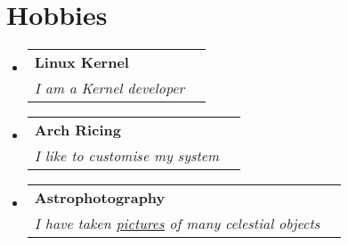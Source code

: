 \documentclass[letterpaper,11pt]{article}
\makeatletter
\newcommand{\resumeSubheading}[4]{
  \vspace{-2pt}\item
    \begin{tabular*}{1.0\textwidth}[t]{l@{\extracolsep{\fill}}r}
      \textbf{#1} & \textbf{\small #2} \\
      \textit{\small#3} & \textit{\small #4} \\
    \end{tabular*}\vspace{-7pt}
}
\newcommand{\resumeSubHeadingListStart}{\begin{itemize}[leftmargin=0.0in, label={}]}
\newcommand{\resumeSubHeadingListEnd}{\end{itemize}}
\makeatother
\begin{document}
\section{Hobbies}
    \resumeSubHeadingListStart
    \resumeSubheading{Linux Kernel}{}{I am a Kernel developer}{}
    \resumeSubheading{Arch Ricing}{}{I like to customise my system}{}
    \resumeSubheading{Astrophotography}{}{I have taken \href{https://telescopius.com/profile/yuhao_han}{\underline{pictures}} of many celestial objects}{}
    \resumeSubHeadingListEnd
\end{document}
